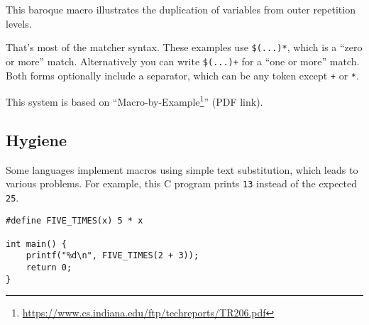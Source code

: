 \documentclass[a4paper,]{book}
\newenvironment{Shaded}{\begin{snugshade}}{\end{snugshade}}
\newcommand{\KeywordTok}[1]{\textcolor[rgb]{0.13,0.29,0.53}{\textbf{{#1}}}}
\newcommand{\DataTypeTok}[1]{\textcolor[rgb]{0.13,0.29,0.53}{{#1}}}
\newcommand{\DecValTok}[1]{\textcolor[rgb]{0.00,0.00,0.81}{{#1}}}
\newcommand{\PreprocessorTok}[1]{\textcolor[rgb]{0.56,0.35,0.01}{\textit{{#1}}}}
\newcommand{\NormalTok}[1]{{#1}}
\renewcommand{\href}[2]{#2\footnote{\url{#1}}}
\begin{document}
This baroque macro illustrates the duplication of variables from outer
repetition levels.

\begin{Shaded}
\end{Shaded}

That's most of the matcher syntax. These examples use \texttt{\$(...)*},
which is a ``zero or more'' match. Alternatively you can write
\texttt{\$(...)+} for a ``one or more'' match. Both forms optionally
include a separator, which can be any token except \texttt{+} or
\texttt{*}.

This system is based on
``\href{https://www.cs.indiana.edu/ftp/techreports/TR206.pdf}{Macro-by-Example}''
(PDF link).

\subsection{Hygiene}\label{hygiene}

Some languages implement macros using simple text substitution, which
leads to various problems. For example, this C program prints
\texttt{13} instead of the expected \texttt{25}.

\begin{verbatim}
#define FIVE_TIMES(x) 5 * x

int main() {
    printf("%d\n", FIVE_TIMES(2 + 3));
    return 0;
}
\end{verbatim}
\end{document}

